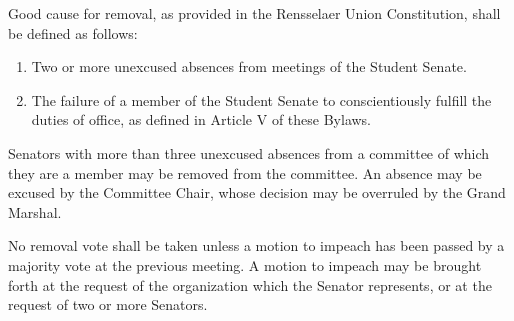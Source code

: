 
\begin{enumerate}

\item Good cause for removal, as provided in the Rensselaer Union Constitution, shall be defined as follows:
\begin{enumerate}
\item Two or more unexcused absences from meetings of the Student Senate.
\item The failure of a member of the Student Senate to conscientiously fulfill the duties of office, as defined in Article V of these
Bylaws.
\end{enumerate}

\item Senators with more than three unexcused absences from a committee of which they are a member may be removed from the
committee. An absence may be excused by the Committee Chair, whose decision may be overruled by the Grand Marshal.

{\bf \item No removal vote shall be taken unless a motion to impeach has been passed by a majority vote at the previous meeting. A motion to impeach may be brought forth at the request of the organization which the Senator represents, or at the request of two or more Senators. }

\end{enumerate}

